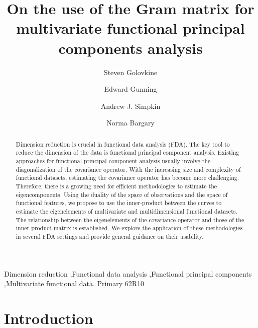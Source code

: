\documentclass[times,sort&compress,3p]{elsarticle}
\theoremstyle{plain}%
\theoremstyle{definition}
\begin{document}
\begin{frontmatter}

\title{On the use of the Gram matrix for multivariate functional principal components analysis}

\author[1]{Steven Golovkine}
\author[2]{Edward Gunning}
\author[3]{Andrew J. Simpkin}
\author[1]{Norma Bargary}

\address[1]{MACSI, Department of Mathematics and Statistics, University of Limerick, Ireland}
\address[2]{Department of Biostatistics and Epidemiology, University of Pennsylvania, USA}
\address[3]{School of Mathematical and Statistical Sciences, University of Galway, Ireland}


\begin{abstract}
Dimension reduction is crucial in functional data analysis (FDA). The key tool to reduce the dimension of the data is functional principal component analysis. Existing approaches for functional principal component analysis usually involve the diagonalization of the covariance operator. With the increasing size and complexity of functional datasets, estimating the covariance operator has become more challenging. Therefore, there is a growing need for efficient methodologies to estimate the eigencomponents. Using the duality of the space of observations and the space of functional features, we propose to use the inner-product between the curves to estimate the eigenelements of multivariate and multidimensional functional datasets. The relationship between the eigenelements of the covariance operator and those of the inner-product matrix is established. We explore the application of these methodologies in several FDA settings and provide general guidance on their usability.
\end{abstract}

\begin{keyword} %
Dimension reduction \sep Functional data analysis \sep Functional principal components \sep Multivariate functional data.
\MSC[2020] Primary 62R10
\end{keyword}

\end{frontmatter}

\section{Introduction} %
\label{sec:introduction}
\end{document}
